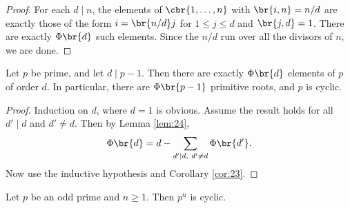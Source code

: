 \begin{proof}
For each $ d \mid n $, the elements of $ \cbr{1, \dots, n} $ with $ \br{i, n} = n / d $ are exactly those of the form $ i = \br{n / d}j $ for $ 1 \le j \le d $ and $ \br{j, d} = 1 $. There are exactly $ \Phi\br{d} $ such elements. Since the $ n / d $ run over all the divisors of $ n $, we are done.
\end{proof}

\pagebreak

\begin{theorem}
\label{thm:25}
Let $ p $ be prime, and let $ d \mid p - 1 $. Then there are exactly $ \Phi\br{d} $ elements of $ \unit{p} $ of order $ d $. In particular, there are $ \Phi\br{p - 1} $ primitive roots, and $ \unit{p} $ is cyclic.
\end{theorem}

\begin{proof}
Induction on $ d $, where $ d = 1 $ is obvious. Assume the result holds for all $ d' \mid d $ and $ d' \ne d $. Then by Lemma \ref{lem:24},
$$ \Phi\br{d} = d - \sum_{d' \mid d, \ d' \ne d} \Phi\br{d'}. $$
Now use the inductive hypothesis and Corollary \ref{cor:23}.
\end{proof}


\begin{proposition}
Let $ p $ be an odd prime and $ n \ge 1 $. Then $ \unit{p^n} $ is cyclic.
\end{proposition}

